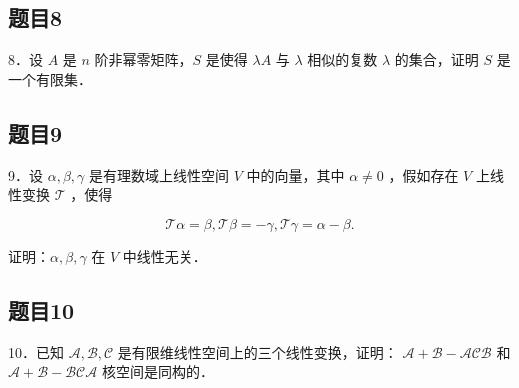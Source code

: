 \documentclass{article}
\begin{document}
\subsection{题目8}
8．设 \(A\) 是 \(n\) 阶非幂零矩阵，\(S\) 是使得 \(\lambda A\) 与 \(\lambda\) 相似的复数 \(\lambda\) 的集合，证明 \(S\) 是一个有限集．

\subsection{题目9}
9．设 \(\alpha, \beta, \gamma\) 是有理数域上线性空间 \(V\) 中的向量，其中 \(\alpha \neq 0\) ，假如存在 \(V\) 上线性变换 \(\mathcal{T}\) ，使得

\[
\mathcal{T} \alpha=\beta, \mathcal{T} \beta=-\gamma, \mathcal{T} \gamma=\alpha-\beta .
\]

证明：\(\alpha, \beta, \gamma\) 在 \(V\) 中线性无关．

\subsection{题目10}
10．已知 \(\mathcal{A}, \mathcal{B}, \mathcal{C}\) 是有限维线性空间上的三个线性变换，证明： \(\mathcal{A}+\mathcal{B}-\mathcal{A} \mathcal{C} \mathcal{B}\) 和 \(\mathcal{A}+\mathcal{B}-\mathcal{B} \mathcal{C} \mathcal{A}\) 核空间是同构的．
\end{document}
